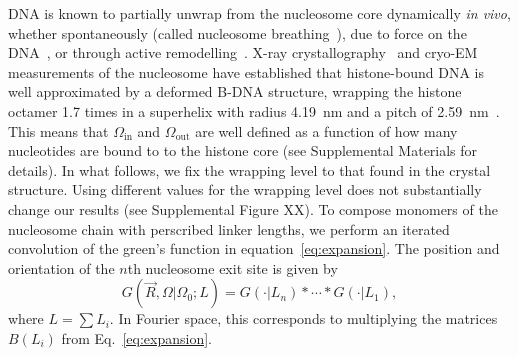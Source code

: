 \documentclass[%
 reprint,
superscriptaddress,
showpacs,preprintnumbers,
 amsmath,amssymb,
 aps,
 prl,
]{revtex4-1}
\newcommand{\greens}[2][\Omega_0; L]{G(#2|#1)}
\begin{document}
DNA is known to partially unwrap from the nucleosome core dynamically \textit{in
    vivo}, whether spontaneously (called nucleosome breathing~\cite{TODO}), due to
    force on the DNA~\cite{TODO}, or through active
    remodelling~\cite{dion2007,kulaeva2007,senavirathne2017}.
X-ray crystallography~\cite{white2001,richmond2003,cutter2015a} and
    cryo-EM~\cite{bednar2017,bilokapic2018,eltsov2018,wakamori2015,zhou2015}
    measurements of the nucleosome have established that histone-bound DNA is
    well approximated by a deformed B-DNA structure, wrapping the histone
    octamer 1.7 times in a superhelix with radius \SI{4.19}{\nano\metre} and a
    pitch of \SI{2.59}{\nano\metre}~\cite{richmond2003}.
This means that $\Omega_\text{in}$ and $\Omega_\text{out}$ are well defined as a
    function of how many nucleotides are bound to to the histone core (see
    Supplemental Materials for details). %
In what follows, we fix the wrapping level to that found in the crystal
    structure.
Using different values for the wrapping level does not substantially change our
    results (see Supplemental Figure XX).
To compose monomers of the nucleosome chain with perscribed linker lengths, we
    perform an iterated convolution of the green's function in
    equation~\ref{eq:expansion}.
The position and orientation of the $n$th nucleosome exit site is given by
\begin{equation}\label{eq:conv}
    \greens{\vec{R},\Omega} = \greens[L_n]{\cdot} * \cdots{} * \greens[L_1]{\cdot},
\end{equation}
    where $L = \sum L_i$.
In Fourier space, this corresponds to multiplying the matrices $B(L_i)$
    from Eq.~\ref{eq:expansion}.
\end{document}
